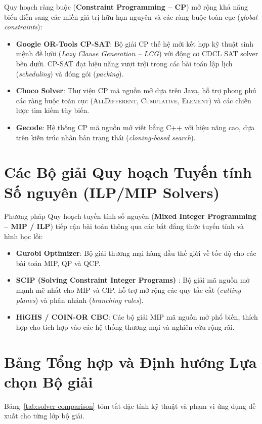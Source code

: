 Quy hoạch ràng buộc (\textbf{Constraint Programming -- CP}) mở rộng khả năng biểu diễn sang các miền giá trị hữu hạn nguyên và các ràng buộc toàn cục (\emph{global constraints}):
\begin{itemize}
  \item \textbf{Google OR-Tools CP-SAT}: Bộ giải CP thế hệ mới kết hợp kỹ thuật sinh mệnh đề lười (\emph{Lazy Clause Generation -- LCG}) với động cơ CDCL SAT solver bên dưới. CP-SAT đạt hiệu năng vượt trội trong các bài toán lập lịch (\emph{scheduling}) và đóng gói (\emph{packing}).
  \item \textbf{Choco Solver}: Thư viện CP mã nguồn mở dựa trên Java, hỗ trợ phong phú các ràng buộc toàn cục (\textsc{AllDifferent}, \textsc{Cumulative}, \textsc{Element}) và các chiến lược tìm kiếm tùy biến.
  \item \textbf{Gecode}: Hệ thống CP mã nguồn mở viết bằng C++ với hiệu năng cao, dựa trên kiến trúc nhân bản trạng thái (\emph{cloning-based search}).
\end{itemize}

\section{Các Bộ giải Quy hoạch Tuyến tính Số nguyên (ILP/MIP Solvers)}

Phương pháp Quy hoạch tuyến tính số nguyên (\textbf{Mixed Integer Programming -- MIP / ILP}) tiếp cận bài toán thông qua các bất đẳng thức tuyến tính và hình học lồi:
\begin{itemize}
  \item \textbf{Gurobi Optimizer}: Bộ giải thương mại hàng đầu thế giới về tốc độ cho các bài toán MIP, QP và QCP.
  \item \textbf{SCIP (Solving Constraint Integer Programs)} \parencite{bestuzheva2021scip}: Bộ giải mã nguồn mở mạnh mẽ nhất cho MIP và CIP, hỗ trợ mở rộng các quy tắc cắt (\emph{cutting planes}) và phân nhánh (\emph{branching rules}).
  \item \textbf{HiGHS / COIN-OR CBC}: Các bộ giải MIP mã nguồn mở phổ biến, thích hợp cho tích hợp vào các hệ thống thương mại và nghiên cứu rộng rãi.
\end{itemize}

\section{Bảng Tổng hợp và Định hướng Lựa chọn Bộ giải}

Bảng~\ref{tab:solver-comparison} tóm tắt đặc tính kỹ thuật và phạm vi ứng dụng đề xuất cho từng lớp bộ giải.

